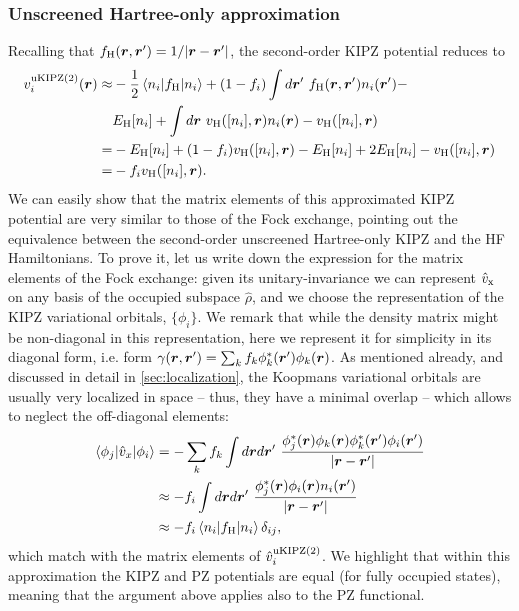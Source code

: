 \subsubsection*{Unscreened Hartree-only approximation}
Recalling that $f_{\rm H}({\bm r},{\bm r}') = 1/|{\bm r}-{\bm r}'|$, the second-order KIPZ potential reduces to
%
\begin{equation}
    \begin{split}
        v^{\rm uKIPZ(2)}_i({\bm r}) \approx &- \frac{1}{2} \braket{n_i|f_{\rm H}|n_i} + (1-f_i) \int d{\bm r}' \ f_{\rm H}({\bm r},{\bm r}') n_i({\bm r}') - \\
        &E_{\rm H}[n_i] + \int d{\bm r} \ v_{\rm H}([n_i],{\bm r}) n_i({\bm r}) - v_{\rm H}([n_i],{\bm r}) \\
        = &- E_{\rm H}[n_i] + (1-f_i) v_{\rm H}([n_i],{\bm r}) - E_{\rm H}[n_i] + 2 E_{\rm H}[n_i] - v_{\rm H}([n_i],{\bm r}) \\
        = &- f_i  v_{\rm H}([n_i],{\bm r}) .
    \end{split}
    \label{eq:kipz-potential-hartree-unscreened}
\end{equation}
%
We can easily show that the matrix elements of this approximated KIPZ potential are very similar to those of the Fock exchange, pointing out the equivalence between the second-order unscreened Hartree-only KIPZ and the HF Hamiltonians. To prove it, let us write down the expression for the matrix elements of the Fock exchange: given its unitary-invariance we can represent $\hat{v}_{\rm x}$ on any basis of the occupied subspace $\hat{\rho}$, and we choose the representation of the KIPZ variational orbitals, $\{ \phi_i \}$. We remark that while the density matrix might be non-diagonal in this representation, here we represent it for simplicity in its diagonal form, i.e. form $\gamma({\bm r},{\bm r}') = \sum_{k} f_{k} \phi_k^*({\bm r}') \phi_k({\bm r})$. As mentioned already, and discussed in detail in \cref{sec:localization}, the Koopmans variational orbitals are usually very localized in space -- thus, they have a minimal overlap -- which allows to neglect the off-diagonal elements:
%
\begin{equation}
    \begin{split}
        \braket{\phi_j|\hat{v}_x|\phi_i} &= - \sum_k f_k \int d{\bm r} d{\bm r}' \ \frac{\phi_j^*({\bm r}) \phi_k({\bm r}) \phi_k^*({\bm r}') \phi_i({\bm r}')}{|{\bm r}-{\bm r}'|} \\
        &\approx - f_i \int d{\bm r} d{\bm r}' \ \frac{\phi_j^*({\bm r}) \phi_i({\bm r}) n_i({\bm r}')}{|{\bm r}-{\bm r}'|} \\
        &\approx - f_i \braket{n_i|f_{\rm H}|n_i} \delta_{ij} ,
    \end{split}
    \label{eq:fock-ex-matrix-elements-approx}
\end{equation}
%
which match with the matrix elements of $\hat{v}^{\rm uKIPZ(2)}_i$. We highlight that within this approximation the KIPZ and PZ potentials are equal (for fully occupied states), meaning that the argument above applies also to the PZ functional.

